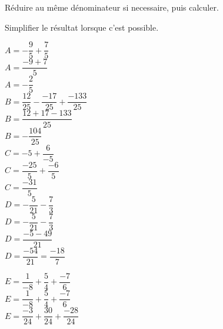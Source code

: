 \begin{corrige}
    Réduire au même dénominateur si necessaire, puis calculer.

    Simplifier le résultat lorsque c'est possible.
        \begin{itemize}
            \def\item{}
            \begin{spacing}{2}
                \item $A=-\dfrac{9}{5}+\dfrac{7}{5}$\\
                {\red $A=\dfrac{-9+7}{5}$\\
                $A=-\dfrac{2}{5}$\\
                }
                \item $B=\dfrac{12}{25}-\dfrac{-17}{25}+\dfrac{-133}{25}$\\
                {\red $B=\dfrac{12+17-133}{25}$\\
                $B=-\dfrac{104}{25}$\\
                }                
                \item $C=-5+\dfrac{6}{-5}$\\
                {\red $C=\dfrac{-25}{5}+\dfrac{-6}{5}$\\
                $C=\dfrac{-31}{5}$\\
                }
                \item $D=-\dfrac{5}{21}-\dfrac{7}{3}$\\
                {\red $D=-\dfrac{5}{21}-\dfrac{7}{3}$\\
                $D=\dfrac{-5-49}{21}$\\
                $D=\dfrac{-54}{21}=\dfrac{-18}{7}$\\
                }
            \end{spacing}
        \end{itemize}
        \Coupe
        \begin{itemize}
            \def\item{}
            \begin{spacing}{2}
                \item $E=\dfrac{1}{-8}+\dfrac{5}{4}+\dfrac{-7}{6}$\\
                {\red $E=\dfrac{1}{-8}+\dfrac{5}{4}+\dfrac{-7}{6}$\\
                $E=\dfrac{-3}{24}+\dfrac{30}{24}+\dfrac{-28}{24}$\\
}
\end{spacing}
\end{itemize}
\end{corrige}
